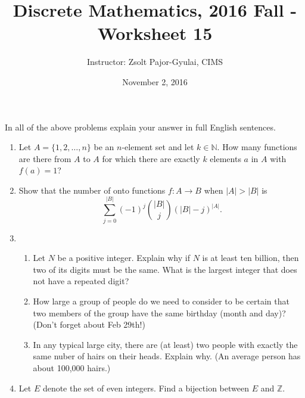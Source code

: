 \documentclass[11pt]{preprint}
\title{Discrete Mathematics, 2016 Fall - Worksheet 15}
\author{Instructor: Zsolt Pajor-Gyulai, CIMS}
\date{November 2, 2016}
\def\enumb{\begin{enumerate}}
\def\enume{\end{enumerate}}
\begin{document}
\maketitle

In all of the above problems explain your answer in full English sentences.

\enumb
\item Let $A=\{1,2,\dots, n\}$ be an $n$-element set and let $k\in\mathbb{N}$. How many functions are there from $A$ to $A$ for which there are exactly $k$ elements $a$ in $A$ with $f(a)=1$?
\item Show that the number of onto functions $f:A\to B$ when $|A|>|B|$ is
\[
\sum_{j=0}^{|B|}(-1)^j\binom{|B|}{j}(|B|-j)^{|A|}.
\]

\item
\enumb
\item Let $N$ be a positive integer. Explain why if $N$ is at least ten billion, then two of its digits must be the same. What is the largest integer that does not have a repeated digit?

\item How large a group of people do we need to consider to be certain that two members of the group have the same birthday (month and day)? (Don't forget about Feb 29th!)

\item In any typical large city, there are (at least) two people with exactly the same nuber of hairs on their heads. Explain why. (An average person has about 100,000 hairs.)
\enume

\item Let $E$ denote the set of even integers. Find a bijection between $E$ and $\mathbb{Z}$.
\enume
\end{document}
